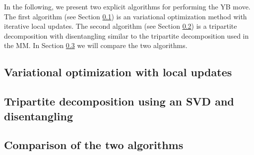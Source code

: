 In the following, we present two explicit algorithms for performing the YB move. The first algorithm (see Section \ref{sec:YB_move_iterative_local_optimization}) is an variational optimization method with iterative local updates. The second algorithm (see Section \ref{sec:YB_move_svd_disentangle}) is a tripartite decomposition with disentangling similar to the tripartite decomposition used in the MM. In Section \ref{sec:YB_move_comparison} we will compare the two algorithms.

\subsection{Variational optimization with local updates}
\label{sec:YB_move_iterative_local_optimization}


\subsection{Tripartite decomposition using an SVD and disentangling}
\label{sec:YB_move_svd_disentangle}


\subsection{Comparison of the two algorithms}
\label{sec:YB_move_comparison}
